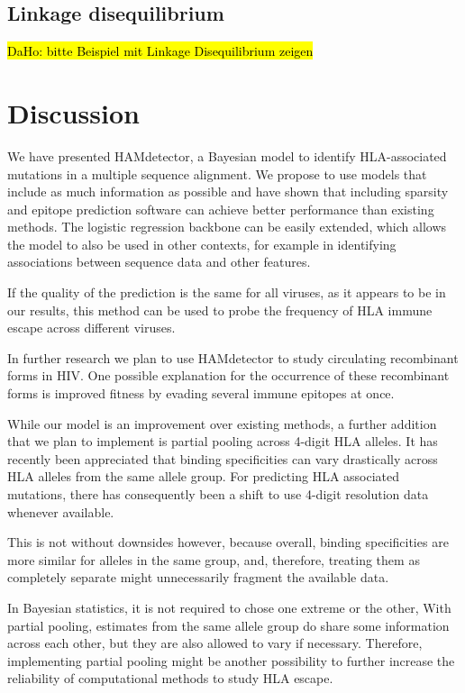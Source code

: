 \documentclass{bioinfo}
\begin{document}
 \subsection{Linkage disequilibrium}
 
 \hl{DaHo: bitte Beispiel mit Linkage Disequilibrium zeigen}

\section{Discussion}

We have presented HAMdetector, a Bayesian model to identify HLA-associated mutations in a multiple sequence alignment. We propose to use models that include as much information as possible and have shown that including sparsity and epitope prediction software can achieve better performance than existing methods. The logistic regression backbone can be easily extended, which allows the model to also be used in other contexts, for example in identifying associations between sequence data and other features.

If the quality of the prediction is the same for all viruses, as it appears to be in our results, this method can be used to probe the frequency of HLA immune escape across different viruses.

In further research we plan to use HAMdetector to study circulating recombinant forms in HIV. One possible explanation for the occurrence of these recombinant forms is improved fitness by evading several immune epitopes at once.

While our model is an improvement over existing methods, a further addition that we plan to implement is partial pooling across 4-digit HLA alleles. It has recently been appreciated that binding specificities can vary drastically across  HLA alleles from the same allele group. For predicting HLA associated mutations, there has consequently been a shift to use 4-digit resolution data whenever available. 

This is not without downsides however, because overall, binding specificities are more similar for alleles in the same group, and, therefore, treating them as completely separate might unnecessarily fragment the available data.

In Bayesian statistics, it is not required to chose one extreme or the other, With partial pooling, estimates from the same allele group do share some information across each other, but they are also allowed to vary if necessary.
Therefore, implementing partial pooling might be another possibility to further increase the reliability of computational methods to study HLA escape.
\end{document}
